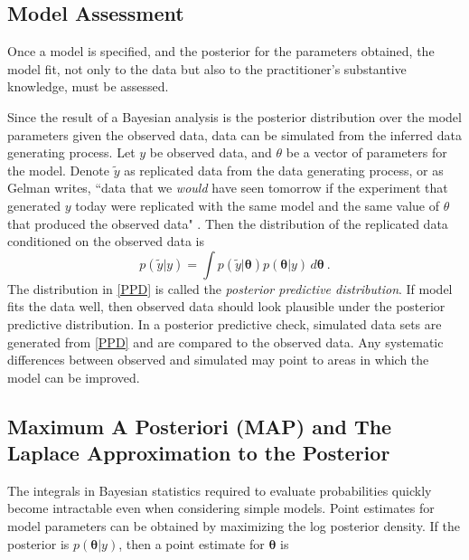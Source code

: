 
\subsection{Model Assessment}

Once a model is specified, and the posterior for the parameters obtained, the model fit, not only to the data but also to the practitioner's substantive knowledge, must be assessed.  

Since the result of a Bayesian analysis is the posterior distribution over the model parameters given the observed data, data can be simulated from the inferred data generating process.  Let $ y $ be observed data, and $ \theta $ be a vector of parameters for the model.  Denote $ \tilde{y} $ as replicated data from the data generating process, or as Gelman writes, ``data that we \textit{would} have seen tomorrow if the experiment that generated $ y $ today were replicated with the same model and the same value of $ \theta $ that produced the observed data" \cite[page~145]{gelman2013bayesian}.  Then the distribution of the replicated data conditioned on the observed data is 
%
\begin{equation}\label{PPD}
	p(\tilde{y} \vert y) = \int p(\tilde{y} \vert \bm{\theta}) p(\bm{\theta} \vert y) \, d\bm{\theta}  \>.
\end{equation}
%
The distribution in \cref{PPD} is called the \textit{posterior predictive distribution}.  If model fits the data well, then observed data should look plausible under the posterior predictive distribution. In a posterior predictive check, simulated data sets are generated from \cref{PPD} and are compared to the observed data.  Any systematic differences between observed and simulated may point to areas in which the model can be improved.

\subsection{Maximum A Posteriori (MAP) and The Laplace Approximation to the Posterior}

The integrals in Bayesian statistics required to evaluate probabilities quickly become intractable even when considering simple models. Point estimates for model parameters can be obtained by maximizing the log posterior density.  If the posterior is $p(\bm{\theta} \vert y)$, then a point estimate for $\bm{\theta}$ is

